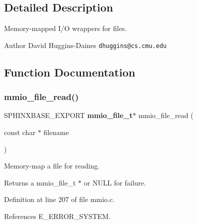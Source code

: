 \subsection{Detailed Description}
Memory-\/mapped I/O wrappers for files. 

\begin{DoxyAuthor}{Author}
David Huggins-\/\+Daines {\tt dhuggins@cs.\+cmu.\+edu} 
\end{DoxyAuthor}


\subsection{Function Documentation}
\mbox{\label{mmio_8h_ae3367a51a50a6108178ecfdd6c983c61}} 
\subsubsection{mmio\+\_\+file\+\_\+read()}
{\footnotesize\ttfamily S\+P\+H\+I\+N\+X\+B\+A\+S\+E\+\_\+\+E\+X\+P\+O\+RT \textbf{ mmio\+\_\+file\+\_\+t}$\ast$ mmio\+\_\+file\+\_\+read (\begin{DoxyParamCaption}\item[{const char $\ast$}]{filename }\end{DoxyParamCaption})}



Memory-\/map a file for reading. 

\begin{DoxyReturn}{Returns}
a mmio\+\_\+file\+\_\+t $\ast$ or N\+U\+LL for failure. 
\end{DoxyReturn}


Definition at line 207 of file mmio.\+c.



References E\+\_\+\+E\+R\+R\+O\+R\+\_\+\+S\+Y\+S\+T\+EM.


